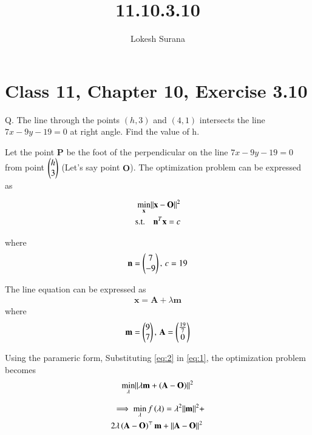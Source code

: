 \documentclass[journal,12pt,twocolumn]{IEEEtran}
\renewcommand{\vec}[1]{\boldsymbol{\mathbf{#1}}}
\begin{document}
\vspace{3cm}
\title{11.10.3.10}
\author{Lokesh Surana}
\maketitle
\section*{Class 11, Chapter 10, Exercise 3.10}

Q. The line through the points $(h, 3)$ and $(4, 1)$ intersects the line $7{x} - 9{y} - 19 = 0$ at right angle. Find the value of h.

\solution Let the point $\vec{P}$ be the foot of the perpendicular on the line $7{x} - 9{y} - 19 = 0$ from point $\begin{pmatrix}h\\3\end{pmatrix}$ (Let's say point $\vec{O}$).
The optimization problem can be expressed as

\begin{align}
    \label{eq:1}
    \min_{\vec{x}} \norm{\vec{x}-\vec{O}}^2\\
    \text{s.t.} \quad \vec{n}^T\vec{x} = c
\end{align}

where
\begin{align}
    \vec{n} = \myvec{7 \\ -9},\,c = 19
\end{align}

The line equation can be expressed as
\begin{align}
    \label{eq:2}
    \vec{x} = \vec{A}+\lambda\vec{m}
\end{align}
where
\begin{align}
    \vec{m} = \myvec{9            \\ 7},\,
    \vec{A} = \myvec{\frac{19}{7} \\ 0}
\end{align}

Using the parameric form, Substituting \eqref{eq:2} in \eqref{eq:1}, the optimization problem becomes
\begin{align}
    \min_{\lambda} \norm{ \lambda\vec{m} +\brak{\vec{A}-\vec{O}}}^2
\end{align}

\begin{align}
    \begin{split}
        \label{eq:3}
        \ \implies \min_{\lambda}f\brak{\lambda} = \lambda^2\norm{\vec{m}}^2 + \\ 2\lambda\brak{\vec{A}-\vec{O}}^\top\vec{m} + \norm{\vec{A}-\vec{O}}^2 \
    \end{split}
\end{align}
\end{document}
